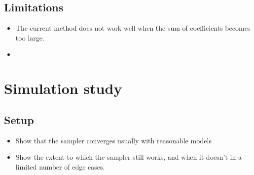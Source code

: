 \documentclass[12pt,a4paper]{article}\usepackage[]{graphicx}\usepackage[]{color}
\begin{document}
%
%
%
%


\subsection{Limitations}

\begin{itemize}
\item The current method does not work well when the sum of coefficients becomes too large.
\item
\end{itemize}

\section{Simulation study}

\subsection{Setup}

\begin{itemize}
\item Show that the sampler converges usually with reasonable models
\item Show the extent to which the sampler still works, and when it doesn't in a limited number of edge cases.
\end{itemize}
\end{document}
